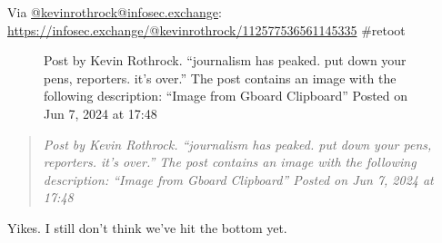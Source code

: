 Via
\href{https://infosec.exchange/@kevinrothrock/}{@kevinrothrock@infosec.exchange}:
\url{https://infosec.exchange/@kevinrothrock/112577536561145335}
\#retoot

\begin{figure}
\centering
{}
\caption{Post by Kevin Rothrock. ``journalism has peaked. put down your
pens, reporters. it's over.'' The post contains an image with the
following description: ``Image from Gboard Clipboard'' Posted on Jun 7,
2024 at 17:48}
\end{figure}

\begin{quote}
\emph{Post by Kevin Rothrock. ``journalism has peaked. put down your
pens, reporters. it's over.'' The post contains an image with the
following description: ``Image from Gboard Clipboard'' Posted on Jun 7,
2024 at 17:48}
\end{quote}

Yikes. I still don't think we've hit the bottom yet.
